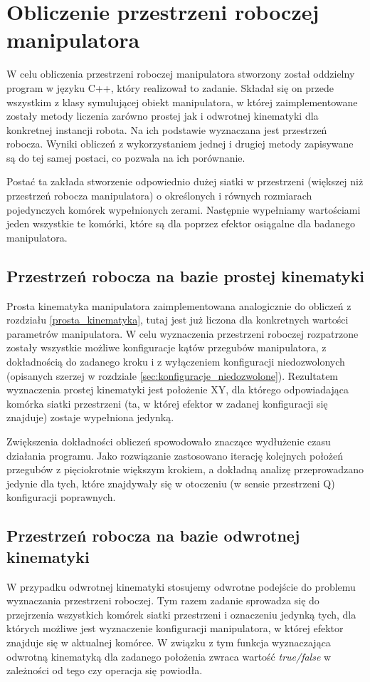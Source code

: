 \documentclass[printmode]{mgr}
\begin{document}
\section{Obliczenie przestrzeni roboczej manipulatora}\label{sec:obliczenie_przestrzeni_roboczej}
W celu obliczenia przestrzeni roboczej manipulatora stworzony został oddzielny program w języku C++, 
który realizował to zadanie. Składał się on przede wszystkim z klasy symulującej obiekt manipulatora, 
w której zaimplementowane zostały metody liczenia zarówno prostej jak i odwrotnej kinematyki dla
konkretnej instancji robota. Na ich podstawie wyznaczana jest przestrzeń robocza. Wyniki obliczeń
z wykorzystaniem jednej i drugiej metody zapisywane są do tej samej postaci, co pozwala na ich porównanie.

Postać ta zakłada stworzenie odpowiednio dużej siatki w przestrzeni (większej niż
przestrzeń robocza manipulatora) o określonych i równych rozmiarach pojedynczych komórek
wypełnionych zerami. Następnie wypełniamy wartościami jeden wszystkie te komórki, które są dla
poprzez efektor osiągalne dla badanego manipulatora. 

\subsection{Przestrzeń robocza na bazie prostej kinematyki}
Prosta kinematyka manipulatora zaimplementowana analogicznie do obliczeń z rozdziału \ref{prosta_kinematyka},
tutaj jest już liczona dla konkretnych wartości parametrów manipulatora. 
W celu wyznaczenia przestrzeni roboczej rozpatrzone zostały wszystkie możliwe konfiguracje
kątów przegubów manipulatora, z dokładnością do zadanego kroku i z wyłączeniem konfiguracji
niedozwolonych (opisanych szerzej w rozdziale \ref{sec:konfiguracje_niedozwolone}).
Rezultatem wyznaczenia prostej kinematyki jest położenie XY, dla którego odpowiadająca komórka
siatki przestrzeni (ta, w której efektor w zadanej konfiguracji się znajduje)
zostaje wypełniona jedynką. 

Zwiększenia dokładności obliczeń spowodowało znaczące wydłużenie czasu działania programu. Jako rozwiązanie
zastosowano iterację kolejnych położeń przegubów z pięciokrotnie większym krokiem, a dokładną analizę przeprowadzano jedynie
dla tych, które znajdywały się w otoczeniu (w sensie przestrzeni Q) konfiguracji poprawnych.

\subsection{Przestrzeń robocza na bazie odwrotnej kinematyki}
W przypadku odwrotnej kinematyki stosujemy odwrotne podejście do problemu wyznaczania przestrzeni roboczej. 
Tym razem zadanie sprowadza się do przejrzenia wszystkich komórek siatki przestrzeni i oznaczeniu
jedynką tych, dla których możliwe jest wyznaczenie konfiguracji manipulatora, w której efektor
znajduje się w aktualnej komórce. W związku z tym funkcja wyznaczająca odwrotną kinematyką
dla zadanego położenia zwraca wartość \emph{true/false} w zależności od tego czy operacja
się powiodła. 
\end{document}
